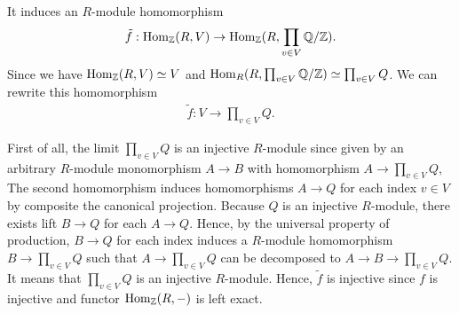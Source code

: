 \begin{solution}
    It induces an $R$-module homomorphism 
    \begin{align*}
        \tilde{f}:\operatorname{Hom}_{\mathbb{Z}}(R,V) \to \operatorname{Hom}_{\mathbb{Z}}(R,\prod_{v\in V}\mathbb{Q}/\mathbb{Z}).
    \end{align*}
    Since we have $\operatorname{Hom}_{\mathbb{Z}}(R,V)\simeq V$ and $\operatorname{Hom}_R(R,\prod_{v\in V}\mathbb{Q}/\mathbb{Z})\simeq \prod_{v\in V} Q$. We can rewrite this homomorphism
    \begin{align*}
        \tilde{f}: V\to \prod_{v\in V} Q.
    \end{align*}

    First of all, the limit $\prod_{v\in V} Q$ is an injective $R$-module since given by an arbitrary $R$-module monomorphism $A \to B$ with homomorphism $A\to \prod_{v\in V} Q$,
    The second homomorphism induces homomorphisms $A\to Q$ for each index $v\in V$ by composite the canonical projection.
    Because $Q$ is an injective $R$-module, there exists lift $B\to Q$ for each $A\to Q$. Hence, by the universal property of production, $B\to Q$ for each index induces a $R$-module homomorphism $B\to \prod_{v\in V} Q$ such that $A\to \prod_{v\in V} Q$
    can be decomposed to $A\to B\to \prod_{v\in V} Q$. It means that $\prod_{v\in V} Q$ is an injective $R$-module.
    Hence, $\tilde{f}$ is injective since $f$ is injective and functor $\operatorname{Hom}_{\mathbb{Z}}(R,-)$ is left exact.


\end{solution}
